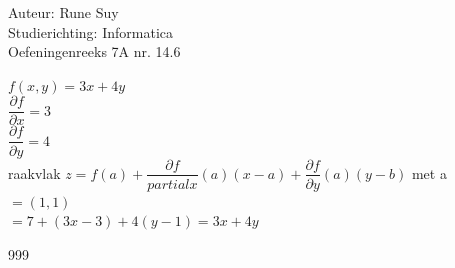 \documentclass[a4paper]{article}
\begin{document}
  
\noindent \large Auteur: Rune Suy \\
\noindent \large Studierichting: Informatica\\
\noindent \large Oefeningenreeks 7A nr. 14.6\\

\medskip

\normalsize

$f(x,y) = 3x + 4y$\\

$\dfrac{\partial f}{\partial x} = 3$\\

$\dfrac{\partial f}{\partial y} = 4$\\

raakvlak $z= f(a) + \dfrac{\partial f}{partial x}(a)(x-a) + \dfrac{\partial f}{\partial y}(a)(y-b)$ met a $= (1,1)$\\

$= 7 + (3x-3) + 4(y-1) = 3x+4y$\\

\begin{thebibliography}{999}
\end{thebibliography}
\end{document}
